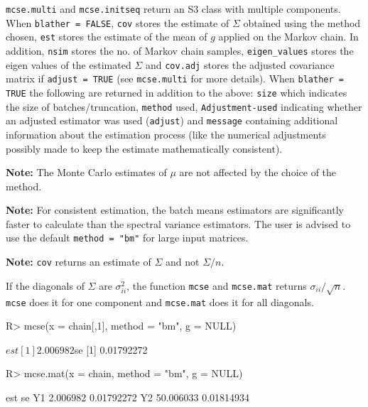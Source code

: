 \documentclass[11pt]{article}
\begin{document}
\texttt{mcse.multi} and \texttt{mcse.initseq} return an S3 class with multiple components. When \texttt{blather = FALSE}, \texttt{cov} stores the estimate of $\Sigma$ obtained using the method chosen, \texttt{est} stores the estimate of the mean of $g$ applied on the Markov chain. In addition, \texttt{nsim} stores the no. of Markov chain samples, \texttt{eigen\_values} stores the eigen values of the estimated $\Sigma$ and \texttt{cov.adj} stores the adjusted covariance matrix if \texttt{adjust = TRUE} (see \texttt{mcse.multi} for more details). When \texttt{blather = TRUE} the following are returned in addition to the above: \texttt{size} which indicates the size of batches/truncation, \texttt{method} used, \texttt{Adjustment-used} indicating whether an adjusted estimator was used (\texttt{adjust}) and \texttt{message} containing additional information about the estimation process (like the numerical adjustments possibly made to keep the estimate mathematically consistent).


  
\bigskip  
  
\textbf{Note: } The Monte Carlo estimates of $\mu$ are not affected by the choice of the method.

\bigskip
\textbf{Note: } For consistent estimation, the batch means estimators are significantly faster to calculate than the spectral variance estimators. The user is advised to use the default \texttt{method = "bm"} for large input matrices.

\bigskip
\textbf{Note: }\texttt{cov} returns an estimate of $\Sigma$ and not $\Sigma/n$. 

\bigskip
If the diagonals of $\Sigma$ are $\sigma_{ii}^2$, the function \texttt{mcse} and \texttt{mcse.mat} returns $\sigma_{ii}/\sqrt{n}$. \texttt{mcse} does it for one component and \texttt{mcse.mat} does it for all diagonals.


\begin{Schunk}
\begin{Sinput}
R> mcse(x = chain[,1], method = "bm", g = NULL)
\end{Sinput}
\begin{Soutput}
$est
[1] 2.006982

$se
[1] 0.01792272
\end{Soutput}
\begin{Sinput}
R> mcse.mat(x = chain, method = "bm", g = NULL)
\end{Sinput}
\begin{Soutput}
         est         se
Y1  2.006982 0.01792272
Y2 50.006033 0.01814934
\end{Soutput}
\end{Schunk}
  
\end{document}
